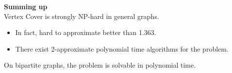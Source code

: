 \documentclass[onecolumn]{report}
\begin{document}
\textbf{Summing up}\\
Vertex Cover is strongly NP-hard in general graphs.
\begin{itemize}
    \item In fact, hard to approximate better than 1.363.
    \item There exist 2-approximate polynomial time algorithms for the problem.
\end{itemize}
On bipartite graphs, the problem is solvable in polynomial time.
\end{document}
